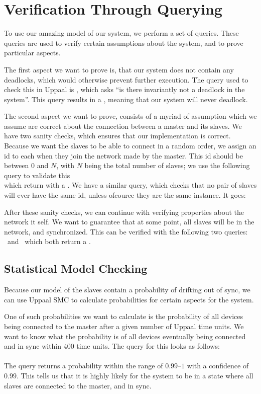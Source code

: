 \chapter{Verification Through Querying}
To use our amazing model of our system, we perform a set of queries.
These queries are used to verify certain assumptions about the system, and to prove particular aspects.

\bigskip
The first aspect we want to prove is, that our system does not contain any deadlocks, which would otherwise prevent further execution.
The query used to check this in Uppaal is , which asks \enquote{is there invariantly not a deadlock in the system}.
This query results in a \success, meaning that our system will never deadlock.

The second aspect we want to prove, consists of a myriad of assumption which we assume are correct about the connection between a master and its slaves.
We have two sanity checks, which ensures that our implementation is correct.
Because we want the slaves to be able to connect in a random order, we assign an id to each when they join the network made by the master.
This id should be between $0$ and $N$, with $N$ being the total number of slaves; we use the following query to validate this\\
which return with a \success.
We have a similar query, which checks that no pair of slaves will ever have the same id, unless ofcource they are the same instance. It goes:\\

After these sanity checks, we can continue with verifying properties about the network it self.
We want to guarantee that at some point, all slaves will be in the network, and synchronized.
This can be verified with the following two queries:\\
~and~
which both return a \success.

\section*{Statistical Model Checking}
Because our model of the slaves contain a probability of drifting out of sync, we can use Uppaal SMC to calculate probabilities for certain aspects for the system.

One of such probabilities we want to calculate is the probability of all devices being connected to the master after a given number of Uppaal time units.
We want to know what the probability is of all devices eventually being connected and in sync within 400 time units.
The query for this looks as follows:\\
\\
The query returns a probability within the range of $0.99$--$1$ with a confidence of $0.99$.
This tells us that it is highly likely for the system to be in a state where all slaves are connected to the master, and in sync.

